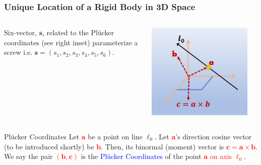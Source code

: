 \begin{frame}
	\frametitle{Unique Location of a Rigid Body in 3D Space}
	\begin{columns}[b]
		\begin{column}{.65\columnwidth}
			\begin{definition}
				Six-vector, $\bm{s}$, related to the Pl{\"u}cker coordinates (see right inset) parameterize a screw i.e. $\bm{s}=\left(s_1, s_2, s_3, s_4, s_5, s_6\right)$.
			\end{definition}
		\end{column}
		\begin{column}{.3\columnwidth}
			\centering
			\includegraphics[width=\textwidth]{figures/plucker_coords.jpg}
		\end{column}
		\label{fig:plucker}
	\end{columns}
	\begin{block}{Pl{\"u}cker Coordinates}
		Let \textcolor{red}{$\bm{a}$} be a point on line $\bm{\ell}_0$. Let \textcolor{red}{$\bm{a}$}'s direction cosine vector (to be introduced shortly) be \textcolor{red}{$\bm{b}$}. Then, its binormal (moment) vector is \textcolor{red}{$\bm{c=a\times b}$}. We say the pair \textcolor{red}{$(\bm{b},\bm{c})$} is the \textcolor{blue}{Pl{\"u}cker Coordinates} of the point  \textcolor{red}{$\bm{a}$ on axis $\bm{\ell}_0$}.
	\end{block}
\end{frame}


